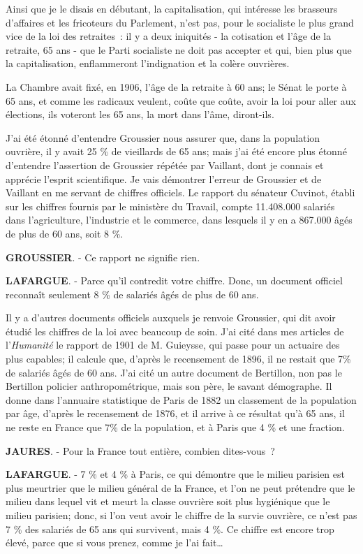 \documentclass[french,twoside]{book} %
\begin{document}
Ainsi que je le disais en débutant, la capitalisation, qui intéresse les brasseurs d’affaires et les fricoteurs du Parlement,  n’est pas, pour le socialiste le plus grand vice de la loi des retraites : il y a deux iniquités - la cotisation et l’âge de la retraite, 65 ans - que le Parti socialiste ne doit pas accepter et qui, bien plus que la capitalisation, enflammeront l’indignation et la colère ouvrières.\par
La Chambre avait fixé, en 1906, l’âge de la retraite à 60 ans; le Sénat le porte à 65 ans, et comme les radicaux veulent, coûte que coûte, avoir la loi pour aller aux élections, ils voteront les 65 ans, la mort dans l’âme, diront-ils.\par
J'ai été étonné d’entendre Groussier nous assurer que, dans la population ouvrière, il y avait 25 \% de vieillards de 65 ans; mais j’ai été encore plus étonné d’entendre l’assertion de Groussier répétée par Vaillant, dont je connais et apprécie l’esprit scientifique. Je vais démontrer l’erreur de Groussier et de Vaillant en me servant de chiffres officiels. Le rapport du sénateur Cuvinot, établi sur les chiffres fournis par le ministère du Travail, compte 11.408.000 salariés dans l’agriculture, l’industrie et le commerce, dans lesquels il y en a 867.000 âgés de plus de 60 ans, soit 8 \%.\par
\textbf{GROUSSIER}. - Ce rapport ne signifie rien.\par
\textbf{LAFARGUE}. - Parce qu’il contredit votre chiffre. Donc, un document officiel reconnaît seulement 8 \% de salariés âgés de plus de 60 ans.\par
Il y a d’autres documents officiels auxquels je renvoie Groussier, qui dit avoir étudié les chiffres de la loi avec beaucoup de soin. J'ai cité dans mes articles de l’\emph{Humanité} le rapport de 1901 de M. Guieysse, qui passe pour un actuaire des plus capables; il calcule que, d’après le recensement de 1896, il ne restait que 7\% de salariés âgés de 60 ans. J'ai cité un autre document de Bertillon, non pas le Bertillon policier anthropométrique, mais son père, le savant démographe. Il donne dans l’annuaire statistique de Paris de 1882 un classement de la population par âge, d’après le recensement de 1876, et il arrive à ce résultat qu’à 65 ans, il ne reste en France que 7\% de la population, et à Paris que 4 \% et une fraction.\par
\textbf{JAURES}. - Pour la France tout entière, combien dites-vous ?\par
\textbf{LAFARGUE}. - 7 \% et 4 \% à Paris, ce qui démontre que le milieu parisien est plus meurtrier que le milieu général de la France, et l’on ne peut prétendre que le milieu dans lequel vit et meurt la classe ouvrière soit plus hygiénique que le milieu parisien; donc, si l’on veut avoir le chiffre de la survie ouvrière, ce n’est pas 7 \% des salariés de 65 ans qui survivent, mais 4 \%. Ce chiffre est encore trop élevé, parce que si vous prenez, comme je l’ai fait…\par
\end{document}

